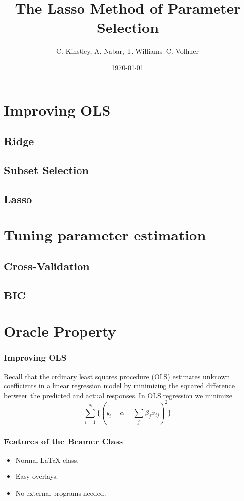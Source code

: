 \documentclass{beamer}
\title{The Lasso Method of Parameter Selection}
\author{C. Kinstley, A. Nabar, T. Williams, C. Vollmer }
\date{\today}
\begin{document}
\frame{\titlepage}

\section[Outline]{}
\frame{\tableofcontents}

\section{Improving OLS}
\subsection{Ridge}
\subsection{Subset Selection}
\subsection{Lasso}

\section{Tuning parameter estimation}
\subsection{Cross-Validation}
\subsection{BIC}

\section{Oracle Property}

\frame
{
\frametitle{Improving OLS}
	Recall that the ordinary least squares procedure (OLS) estimates unknown coefficients in a linear regression model by minimizing the squared difference between the predicted and actual responses.
	In OLS regression we minimize
	\begin{equation*}
\sum_{i=1}^N\{(y_i - \alpha-\sum_j\beta_jx_{ij} )^2 \}
	\end{equation*}
}


\frame
{
  \frametitle{Features of the Beamer Class}

  \begin{itemize}
  \item<1-> Normal LaTeX class.
  \item<2-> Easy overlays.
  \item<3-> No external programs needed.      
  \end{itemize}
}
\end{document}
